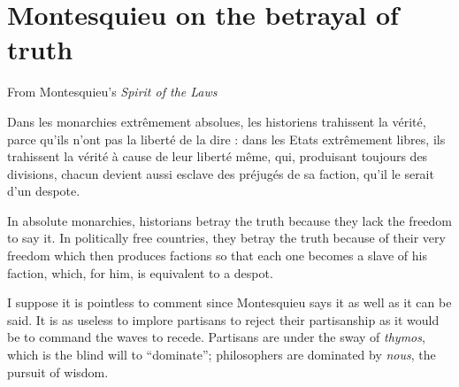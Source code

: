 \section{Montesquieu on the betrayal of truth}

From Montesquieu's \textit{Spirit of the Laws}

\begin{quotex}
Dans les monarchies extrêmement absolues, les historiens trahissent la vérité, parce qu'ils n'ont pas la liberté de la dire : dans les Etats extrêmement libres, ils trahissent la vérité à cause de leur liberté même, qui, produisant toujours des divisions, chacun devient aussi esclave des préjugés de sa faction, qu'il le serait d'un despote.
\end{quotex}


\begin{quotex}
In absolute monarchies, historians betray the truth because they lack the freedom to say it. In politically free countries, they betray the truth because of their very freedom which then produces factions so that each one becomes a slave of his faction, which, for him, is equivalent to a despot.
\end{quotex}


I suppose it is pointless to comment since Montesquieu says it as well as it can be said. It is as useless to implore partisans to reject their partisanship as it would be to command the waves to recede. Partisans are under the sway of \emph{thymos}, which is the blind will to ``dominate''; philosophers are dominated by \emph{nous}, the pursuit of wisdom.



